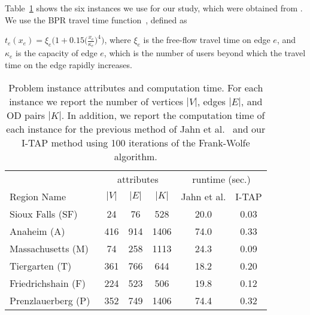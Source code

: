 \documentclass{article}
\newif\ifarxiv   %
\begin{document}
Table~\ref{tab:problem-instances} shows the six instances we use for our study, which were obtained from \cite{tntp}. %
We use %
the BPR travel time function~\cite{Sheffi1985}, %
defined as
\ifarxiv 
\begin{align} \label{eq:BPR}
    t_e(x_e) = \xi_e \left(1+ a \left(\tfrac{x_e}{\kappa_e} \right)^b \right),
\end{align}
where $a,b$ are constants, $\xi_e$ is the free-flow travel time on edge $e$, and $\kappa_e$ is the capacity of edge $e$, which is the number of users beyond which the travel time on the edge rapidly increases. Since the constants $a = 0.15$ and $b = 4$ are typically chosen, we use these constants for the numerical experiments. 
\else
$t_e(x_e) = \xi_e \big(1+ 0.15 \big(\tfrac{x_e}{\kappa_e} \big)^4 \big)$,
where $\xi_e$ is the free-flow travel time on edge $e$, and $\kappa_e$ is the capacity of edge $e$, which is the number of users beyond which the travel time on the edge rapidly increases.
\fi 

\begin{table}[t] 
\centering
\caption{{\small \sf Problem instance attributes and computation time. For each instance we report the number of vertices $|V|$, edges $|E|$, and %
OD pairs $|K|$. In addition, we report the computation time of each instance for the previous method of Jahn et al.~\cite{so-routing-seminal} and our I-TAP method using 100 iterations of the Frank-Wolfe algorithm. }  }
\footnotesize
\begin{tabular}{l|ccc|cc}
\toprule

 &      \multicolumn{3}{|c|}{attributes} & \multicolumn{2}{c}{runtime (sec.)}    \\ 
Region Name  & $|V|$ & $|E|$ & $|K|$ & Jahn et al. & I-TAP \\
\midrule 
Sioux Falls (SF) & 24 & 76 & 528 & 20.0 & 0.03 \\
Anaheim (A) & 416 & 914  & 1406 & 74.0 & 0.33 \\
Massachusetts (M) & 74 & 258 & 1113  & 24.3 & 0.09 \\
Tiergarten (T)  & 361 & 766 & 644  & 18.2 & 0.20 \\
Friedrichshain (F)  & 224 & 523 & 506  & 19.8 & 0.12 \\
Prenzlauerberg (P)\  & 352 & 749 & 1406  & 74.4 & 0.32 \\
\bottomrule
\end{tabular} \label{tab:problem-instances}
\end{table}
\end{document}
